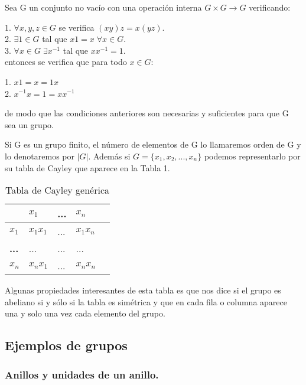 \begin{nprop}
Sea G un conjunto no vacío con una operación interna $G \times G \rightarrow G$ verificando:

1. $\forall x,y,z \in G$ se verifica $(xy)z = x(yz)$. \\
2. $\exists 1 \in G$ tal que $x1 = x \; \forall x \in G$. \\
3. $\forall x \in G \; \exists x^{-1}$ tal que $xx^{-1} = 1$. \\

entonces se verifica que para todo $x \in G$:

1. $x1 = x = 1x$ \\
2. $x^{-1}x = 1 = xx^{-1}$

de modo que las condiciones anteriores son necesarias y suficientes para que G sea un grupo.
\end{nprop}

\begin{ndef}
Si G es un grupo finito, el número de elementos de G lo llamaremos orden de G y lo denotaremos por $|G|$. Además si $G = \{x_1,x_2,...,x_n\}$ podemos representarlo por su tabla de Cayley que aparece en la Tabla 1.

\begin{table}
\centering
\caption{Tabla de Cayley genérica}
\begin{tabular}{l|llll}
 & \textbf{$x_1$} & \textbf{...} & \textbf{$x_n$} \\
\hline
\textbf{$x_1$} & $x_1 x_1$ & ... & $x_1 x_n$\\
\textbf{...} & ... & ... & ... \\
\textbf{$x_n$} & $x_n x_1$ & ... & $x_n x_n$\\
\end{tabular}
\end{table}
\end{ndef}

Algunas propiedades interesantes de esta tabla es que nos dice si el grupo es abeliano si y sólo si la tabla es simétrica y que en cada fila o columna aparece una y solo una vez cada elemento del grupo.

\subsection{Ejemplos de grupos}

\subsubsection{Anillos y unidades de un anillo.}


